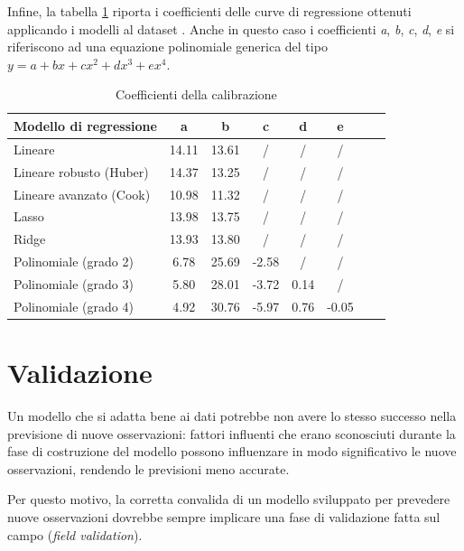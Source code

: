 \clearpage

Infine, la tabella \ref{fig:risultati-pm10-coefficienti} riporta i coefficienti delle curve di regressione ottenuti applicando i modelli al dataset . Anche in questo caso i coefficienti \textit{a}, \textit{b}, \textit{c}, \textit{d}, \textit{e} si riferiscono ad una equazione polinomiale generica del tipo $y=a+bx+cx^2+dx^3+ex^4$.

\begin{table}[H]
    \footnotesize
    \centering
    \begin{tabular}{|l|c|c|c|c|c|c|c|}
    \hline
        \textbf{Modello di regressione} & \textbf{a} & \textbf{b} & \textbf{c} & \textbf{d} & \textbf{e} \\ \hline
        Lineare & 14.11 & 13.61 & / & / & / \\ \hline
        Lineare robusto (Huber) & 14.37 & 13.25 & / & / & / \\ \hline
        Lineare avanzato (Cook) & 10.98 & 11.32 & / & / & / \\ \hline
        Lasso & 13.98 & 13.75 & / & / & / \\ \hline
        Ridge & 13.93 & 13.80 & / & / & / \\ \hline
        Polinomiale (grado 2) & 6.78 & 25.69 & -2.58 & / & / \\ \hline
        Polinomiale (grado 3) & 5.80 & 28.01 & -3.72 & 0.14 & / \\ \hline
        Polinomiale (grado 4) & 4.92 & 30.76 & -5.97 & 0.76 & -0.05 \\ \hline
    \end{tabular}
    \captionsetup{justification=centering}
    \caption{Coefficienti della calibrazione }
    \label{fig:risultati-pm10-coefficienti}
\end{table}

\section{Validazione}\label{sec:validazione}
Un modello che si adatta bene ai dati potrebbe non avere lo stesso successo nella previsione di nuove osservazioni: fattori influenti che erano sconosciuti durante la fase di costruzione del modello possono influenzare in modo significativo le nuove osservazioni, rendendo le previsioni meno accurate.

Per questo motivo, la corretta convalida di un modello sviluppato per prevedere nuove osservazioni dovrebbe sempre implicare una fase di validazione fatta sul campo (\textit{field validation}).

